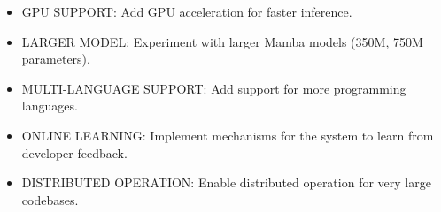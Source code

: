 
\begin{itemize}
    \item GPU SUPPORT: Add GPU acceleration for faster inference.
    \item LARGER MODEL: Experiment with larger Mamba models (350M, 750M parameters).
    \item MULTI-LANGUAGE SUPPORT: Add support for more programming languages.
    \item ONLINE LEARNING: Implement mechanisms for the system to learn from developer feedback.
    \item DISTRIBUTED OPERATION: Enable distributed operation for very large codebases.
\end{itemize}

